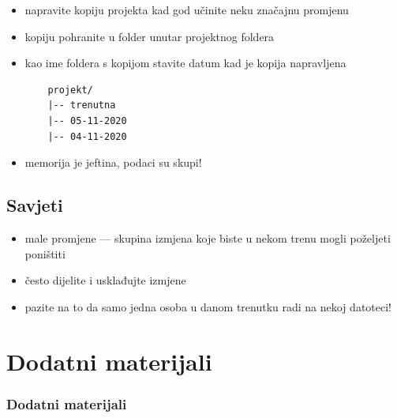 \documentclass[aspectratio=169]{beamer}
\newenvironment{noheadline}{
    \setbeamertemplate{headline}{}
}{}
\begin{document}
\begin{frame}[fragile]
    \begin{itemize}
        \setlength{\itemsep}{2em}

        \item napravite kopiju projekta kad god učinite neku značajnu promjenu

        \pause

        \item kopiju pohranite u folder unutar projektnog foldera

        \item kao ime foldera s kopijom stavite datum kad je kopija napravljena

        \pause

        \begin{lstlisting}
    projekt/
    |-- trenutna
    |-- 05-11-2020
    |-- 04-11-2020
        \end{lstlisting}

        \pause

        \item memorija je jeftina, podaci su skupi!
    \end{itemize}
\end{frame}

\subsection{Savjeti}

\begin{frame}
    \begin{itemize}
        \setlength{\itemsep}{2em}

        \item male promjene --- skupina izmjena koje biste u nekom trenu
            mogli poželjeti poništiti

        \pause

        \item često dijelite i usklađujte izmjene

        \pause

        \item pazite na to da samo jedna osoba u danom trenutku radi na nekoj
            datoteci!
    \end{itemize}
\end{frame}

\section{Dodatni materijali}

\begin{noheadline}
    \begin{frame}
        \frametitle{Dodatni materijali}
    \end{frame}
\end{noheadline}
\end{document}
